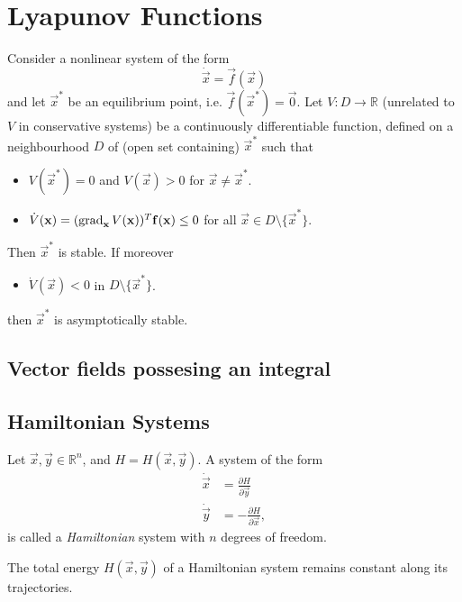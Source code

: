 \section{Lyapunov Functions}
\begin{theorem}
	Consider a nonlinear system of the form
	\begin{equation*}
		\dot{\vec x} = \vec f(\vec x)
	\end{equation*}
	and let $\vec x^\ast$ be an equilibrium point, i.e. $\vec f(\vec x^\ast) = \vec 0$.
	Let $V: D \to \mathbb R$ (unrelated to $V$ in conservative systems) be a continuously differentiable function, defined on a neighbourhood $D$ of (open set containing) $\vec x^\ast$ such that
	\begin{itemize}
		\item $V(\vec x^\ast) = 0$ and $V(\vec x) > 0$ for $\vec x \neq \vec x^\ast$.
		\item $\dot V(\boldsymbol{\mathbf{x}}) = (\operatorname{grad}_{\boldsymbol{\mathbf{x}}} V(\boldsymbol{\mathbf{x}}))^T \boldsymbol{\mathbf{f}}(\boldsymbol{\mathbf{x}}) \leq 0$ for all $\vec x \in D \setminus \{\vec x^\ast\}$.
	\end{itemize}
	Then $\vec x^\ast$ is stable. If moreover
	\begin{itemize}
		\item $\dot V(\vec x) < 0$ in $D \setminus \{\vec x^\ast\}$.
	\end{itemize}
	then $\vec x^\ast$ is asymptotically stable.
\end{theorem}

\subsection{Vector fields possesing an integral}
\subsection{Hamiltonian Systems}
Let $\vec x, \vec y \in \mathbb R^n$, and $H = H(\vec x, \vec y)$. A system of the form
\begin{align*}
	\dot{\vec x} &= \frac{\partial H}{\partial \vec y} \\
	\dot{\vec y} &= -\frac{\partial H}{\partial \vec x},
\end{align*}
is called a \emph{Hamiltonian} system with $n$ degrees of freedom.

\begin{theorem}
	The total energy $H(\vec x, \vec y)$ of a Hamiltonian system remains constant along its trajectories.
\end{theorem}

